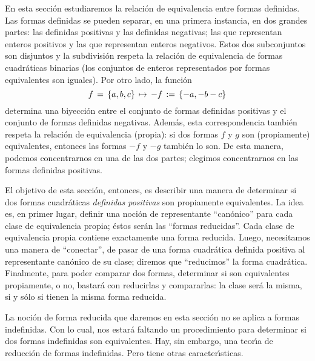 \theoremstyle{plain}
\newtheorem{teoReducidas}{\teoname}[section]
\newtheorem{lemaReducidas}[teoReducidas]{\lemaname}
\newtheorem{coroReducidas}[teoReducidas]{\coroname}

\theoremstyle{definition}
\newtheorem{defReducidas}[teoReducidas]{}
\newtheorem{obsReducidas}[teoReducidas]{\obsname}
\newtheorem{ejemReducidas}[teoReducidas]{\ejemname}


En esta secci\'on estudiaremos la relaci\'on de equivalencia
entre formas definidas. Las formas definidas se pueden separar,
en una primera instancia, en dos grandes partes: las definidas
positivas y las definidas negativas; las que representan enteros
positivos y las que representan enteros negativos.
Estos dos subconjuntos son disjuntos y la subdivisi\'on
respeta la relaci\'on de equivalencia de formas cuadr\'aticas binarias
(los conjuntos de enteros representados por formas equivalentes son
iguales). Por otro lado, la funci\'on
\begin{displaymath}
	f\,=\,\left\{a,b,c\right\}\,\mapsto\,-f\,:=\,\left\{-a,-b-c\right\}
\end{displaymath}
%
determina una biyecci\'on entre el conjunto de formas definidas positivas
y el conjunto de formas definidas negativas. Adem\'as, esta
correspondencia tambi\'en respeta la relaci\'on de equivalencia
(propia): si dos formas $f$ y $g$ son (propiamente) equivalentes,
entonces las formas $-f$ y $-g$ tambi\'en lo son.
De esta manera, podemos concentrarnos en una de las dos partes;
elegimos concentrarnos en las formas definidas positivas.

El objetivo de esta secci\'on, entonces, es describir una manera de
determinar si dos formas cuadr\'aticas \emph{definidas positivas}
son propiamente equivalentes.
La idea es, en primer lugar, definir una noci\'on de representante
``can\'onico'' para cada clase de equivalencia propia; \'estos
ser\'an las ``formas reducidas''. Cada clase de equivalencia propia
contiene exactamente una forma reducida. Luego, necesitamos una manera
de ``conectar'', de pasar de una forma cuadr\'atica definida positiva
al representante can\'onico de su clase; diremos que ``reducimos'' la
forma cuadr\'atica. Finalmente, para poder comparar dos formas, determinar
si son equivalentes propiamente, o no, bastar\'a con reducirlas y
compararlas: la clase ser\'a la misma, si y s\'olo si tienen la misma
forma reducida.

La noci\'on de forma reducida que daremos en esta secci\'on
no se aplica a formas indefinidas.
Con lo cual, nos estar\'a faltando un procedimiento para
determinar si dos formas indefinidas son equivalentes.
Hay, sin embargo, una teor\'{\i}a de reducci\'on de formas indefinidas.
Pero tiene otras caracter\'{\i}sticas.


